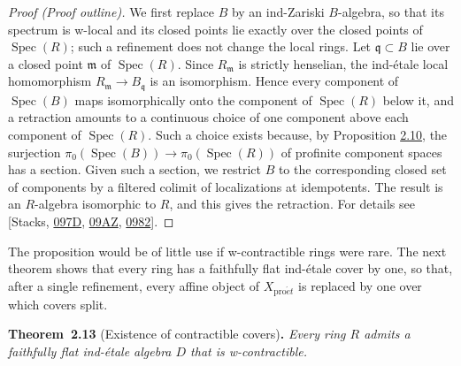 \documentclass[11pt]{article}
\newenvironment{bpstatement}[2]{\par\addvspace{0.6\baselineskip}\noindent\textbf{#1}#2\textbf{.}\enspace\ignorespaces}
  {\par\addvspace{0.4\baselineskip}}
\newenvironment{bpstatementit}[2]{\begin{bpstatement}{#1}{#2}\itshape\ignorespaces}{\end{bpstatement}}
\begin{document}
\begin{proof}[{Proof (Proof outline)}]\label{bp37}%
We first replace \(B\) by an ind-Zariski \(B\)-algebra, so that its spectrum is w-local and its closed points lie exactly over the closed points of \(\operatorname{Spec}(R)\); such a refinement does not change the local rings. Let \(\mathfrak q\subset B\) lie over a closed point \(\mathfrak m\) of \(\operatorname{Spec}(R)\). Since \(R_{\mathfrak m}\) is strictly henselian, the ind-étale local homomorphism \(R_{\mathfrak m}\to B_{\mathfrak q}\) is an isomorphism. Hence every component of \(\operatorname{Spec}(B)\) maps isomorphically onto the component of \(\operatorname{Spec}(R)\) below it, and a retraction amounts to a continuous choice of one component above each component of \(\operatorname{Spec}(R)\). Such a choice exists because, by Proposition \hyperref[bp30]{2.10}, the surjection \(\pi_0(\operatorname{Spec}(B))\to\pi_0(\operatorname{Spec}(R))\) of profinite component spaces has a section. Given such a section, we restrict \(B\) to the corresponding closed set of components by a filtered colimit of localizations at idempotents. The result is an \(R\)-algebra isomorphic to \(R\), and this gives the retraction. For details see [Stacks, \href{https://stacks.math.columbia.edu/tag/097D}{097D}, \href{https://stacks.math.columbia.edu/tag/09AZ}{09AZ}, \href{https://stacks.math.columbia.edu/tag/0982}{0982}].
\end{proof}

\label{bp38}%
The proposition would be of little use if w-contractible rings were rare. The next theorem shows that every ring has a faithfully flat ind-étale cover by one, so that, after a single refinement, every affine object of \(X_{\mathrm{pro}\acute{e}t}\) is replaced by one over which covers split.

\label{bp39}%
\begin{bpstatementit}{Theorem~2.13}{ (Existence of contractible covers)}
Every ring \(R\) admits a faithfully flat ind-étale algebra \(D\) that is w-contractible.
\end{bpstatementit}
\end{document}
